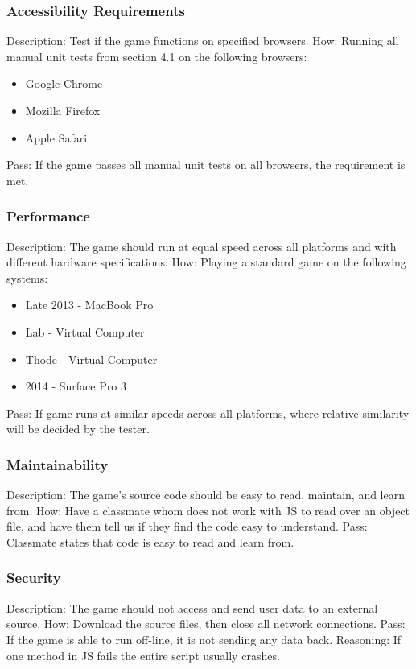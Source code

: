 \documentclass{article}
\begin{document}
\subsubsection{Accessibility Requirements}
Description: Test if the game functions on specified browsers.
How: Running all manual unit tests from section 4.1 on the following browsers:
\begin{itemize}
\item Google Chrome
\item Mozilla Firefox
\item Apple Safari
\end{itemize}
Pass:  If the game passes all manual unit tests on all browsers, the requirement
 is met.\newline


 \subsubsection{Performance}
Description: The game should run at equal speed across all platforms and with different 
hardware specifications.  \newline
How: Playing a standard game on the following systems: 
\begin{itemize}
\item Late 2013 - MacBook Pro
\item Lab - Virtual Computer
\item Thode - Virtual Computer
\item 2014 - Surface Pro 3
\end{itemize}
Pass: If game runs at similar speeds across all platforms, where relative 
similarity will be decided by the tester.

 \subsubsection{Maintainability}
 Description: The game's source code should be easy to read, maintain, and 
 learn from. \newline
 How: Have a classmate whom does not work with JS to read over an object file, 
 and have them tell us if they find the code easy to understand. \newline
 Pass: Classmate states that code is easy to read and learn from.

 \subsubsection{Security}
Description: The game should not access and send user data to an external 
source. \newline
How: Download the source files, then close all network connections.\newline
Pass: If the game is able to run off-line, it is not sending any data back.
Reasoning: If one method in JS fails the entire script usually crashes.
\end{document}
